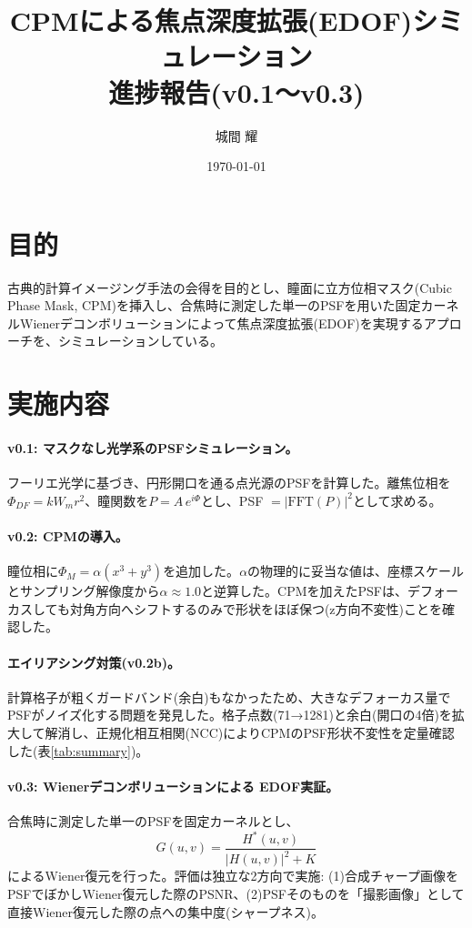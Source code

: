 \documentclass[11pt]{article}
\title{\textbf{CPMによる焦点深度拡張(EDOF)シミュレーション\\進捗報告(v0.1〜v0.3)}}
\author{城間 耀}
\date{\today}
\begin{document}
\maketitle
\vspace{-1.5em}

\section{目的}
古典的計算イメージング手法の会得を目的とし、瞳面に立方位相マスク(Cubic Phase Mask, CPM)を挿入し、合焦時に測定した単一のPSFを用いた固定カーネルWienerデコンボリューションによって焦点深度拡張(EDOF)を実現するアプローチ\cite{report_chang}を、シミュレーションしている。
\section{実施内容}

\paragraph{v0.1: マスクなし光学系のPSFシミュレーション。}
フーリエ光学に基づき、円形開口を通る点光源のPSFを計算した。離焦位相を$\Phi_{DF}=kW_m r^2$、瞳関数を$P=A\,e^{i\Phi}$とし、PSF $=|\mathrm{FFT}(P)|^2$として求める。

\paragraph{v0.2: CPMの導入。}
瞳位相に$\Phi_M=\alpha(x^3+y^3)$を追加した。$\alpha$の物理的に妥当な値は、座標スケールとサンプリング解像度から$\alpha\approx 1.0$と逆算した。CPMを加えたPSFは、デフォーカスしても対角方向へシフトするのみで形状をほぼ保つ(z方向不変性)ことを確認した。

\paragraph{エイリアシング対策(v0.2b)。}
計算格子が粗くガードバンド(余白)もなかったため、大きなデフォーカス量でPSFがノイズ化する問題を発見した。格子点数(71→1281)と余白(開口の4倍)を拡大して解消し、正規化相互相関(NCC)によりCPMのPSF形状不変性を定量確認した(表\ref{tab:summary})。

\paragraph{v0.3: Wienerデコンボリューションによる EDOF実証。}
合焦時に測定した単一のPSFを固定カーネルとし、
\begin{equation}
G(u,v) = \frac{H^*(u,v)}{|H(u,v)|^2 + K}
\end{equation}
によるWiener復元を行った。評価は独立な2方向で実施: (1)合成チャープ画像をPSFでぼかしWiener復元した際のPSNR、(2)PSFそのものを「撮影画像」として直接Wiener復元した際の点への集中度(シャープネス)。
\end{document}
